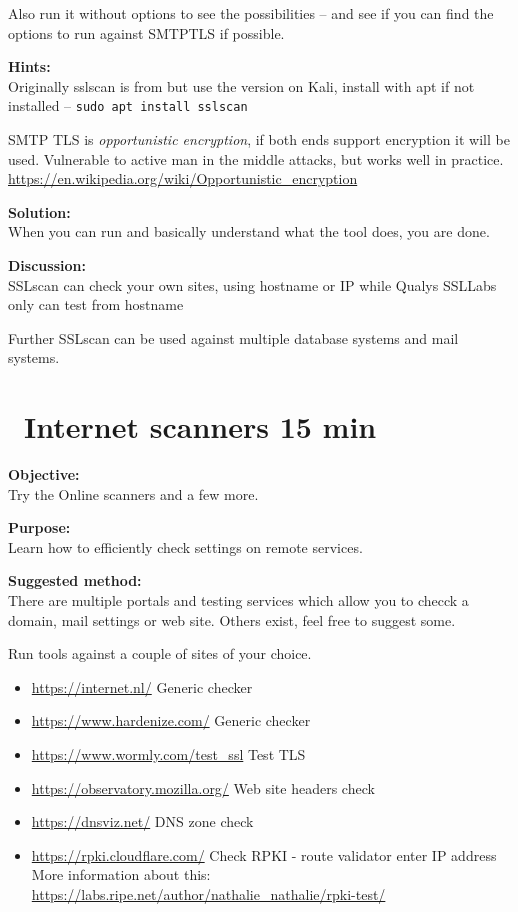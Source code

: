 \documentclass[a4paper,11pt,notitlepage]{report}
\begin{document}
Also run it without options to see the possibilities -- and see if you can find the options to run against SMTPTLS if possible.

{\bf Hints:}\\
Originally sslscan is from  but use the version on Kali, install with apt if not installed -- \verb+sudo apt install sslscan+

SMTP TLS is \emph{opportunistic encryption}, if both ends support encryption it will be used. Vulnerable to active man in the middle attacks, but works well in practice.\\
\url{https://en.wikipedia.org/wiki/Opportunistic_encryption}

{\bf Solution:}\\
When you can run and basically understand what the tool does, you are done.

{\bf Discussion:}\\
SSLscan can check your own sites, using hostname or IP while Qualys SSLLabs only can test from hostname

Further SSLscan can be used against multiple database systems and mail systems.

\chapter{\faInfoCircle\ Internet scanners 15 min}
\label{ex:web-site-check}

{\bf Objective:}\\
Try the Online scanners  and a few more.

{\bf Purpose:}\\
Learn how to efficiently check settings on remote services.

{\bf Suggested method:}\\
There are multiple portals and testing services which allow you to checck a domain,
mail settings or web site. Others exist, feel free to suggest some.

Run tools against a couple of sites of your choice.
\begin{itemize}
\item \url{https://internet.nl/} Generic checker
\item \url{https://www.hardenize.com/} Generic checker
\item \url{https://www.wormly.com/test_ssl} Test TLS
\item \url{https://observatory.mozilla.org/} Web site headers check
\item \url{https://dnsviz.net/} DNS zone check
\item \url{https://rpki.cloudflare.com/} Check RPKI - route validator enter
IP address\\
More information about this: \url{https://labs.ripe.net/author/nathalie_nathalie/rpki-test/}
\end{itemize}
\end{document}
